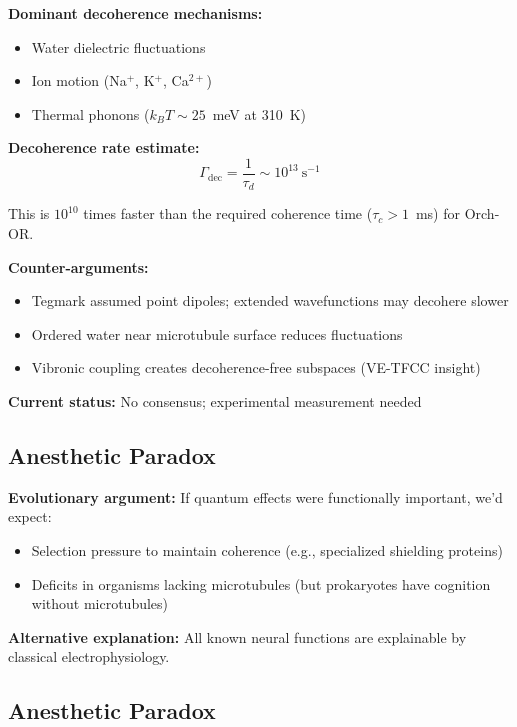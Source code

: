 \textbf{Dominant decoherence mechanisms:}
\begin{itemize}
\item Water dielectric fluctuations
\item Ion motion (Na$^+$, K$^+$, Ca$^{2+}$)
\item Thermal phonons ($k_B T \sim 25$~meV at 310~K)
\end{itemize}

\textbf{Decoherence rate estimate:}
\begin{equation}
\Gamma_{\mathrm{dec}} = \frac{1}{\tau_d} \sim 10^{13}\ \mathrm{s}^{-1}
\end{equation}

This is $10^{10}$ times faster than the required coherence time ($\tau_c > 1$~ms) for Orch-OR.

\textbf{Counter-arguments:}
\begin{itemize}
\item Tegmark assumed point dipoles; extended wavefunctions may decohere slower
\item Ordered water near microtubule surface reduces fluctuations
\item Vibronic coupling creates decoherence-free subspaces (VE-TFCC insight)
\end{itemize}

\textbf{Current status:} No consensus; experimental measurement needed

\subsection{Anesthetic Paradox}\label{anesthetic-paradox}

\textbf{Evolutionary argument:} If quantum effects were functionally important, we'd expect:
\begin{itemize}
\item Selection pressure to maintain coherence (e.g., specialized shielding proteins)
\item Deficits in organisms lacking microtubules (but prokaryotes have cognition without microtubules)
\end{itemize}

\textbf{Alternative explanation:} All known neural functions are explainable by classical electrophysiology.

\subsection{Anesthetic Paradox}

